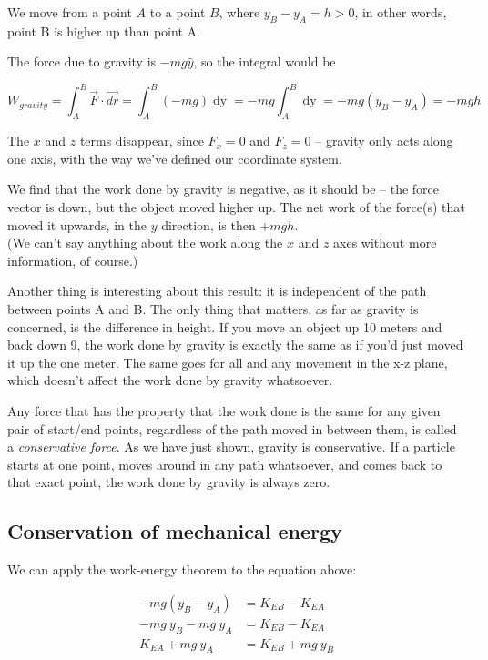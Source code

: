 We move from a point $A$ to a point $B$, where $y_B - y_A = h > 0$, in other words, point B is higher up than point A.

The force due to gravity is $- m g \hat{y}$, so the integral would be

\begin{equation}
W_{gravity} = \int_A^B \vec{F} \cdot \vec{dr} = \int_A^B (- m g) \mathop{dy} = - m g \int_A^B \mathop{dy} = -m g(y_B - y_A) = -m g h
\end{equation}

The $x$ and $z$ terms disappear, since $F_x = 0$ and $F_z = 0$ -- gravity only acts along one axis, with the way we've defined our coordinate system.

We find that the work done by gravity is negative, as it should be -- the force vector is down, but the object moved higher up. The net work of the force(s) that moved it upwards, in the $y$ direction, is then $+ m g h$.\\
(We can't say anything about the work along the $x$ and $z$ axes without more information, of course.)

Another thing is interesting about this result: it is independent of the path between points A and B. The only thing that matters, as far as gravity is concerned, is the difference in height. If you move an object up 10 meters and back down 9, the work done by gravity is exactly the same as if you'd just moved it up the one meter. The same goes for all and any movement in the x-z plane, which doesn't affect the work done by gravity whatsoever.

Any force that has the property that the work done is the same for any given pair of start/end points, regardless of the path moved in between them, is called a \emph{conservative force}. As we have just shown, gravity is conservative. If a particle starts at one point, moves around in any path whatsoever, and comes back to that exact point, the work done by gravity is always zero.

\subsection{Conservation of mechanical energy}

We can apply the work-energy theorem to the equation above:

\begin{align}
-m g(y_B - y_A)& = K_{EB} - K_{EA}\\
-m g\ y_B - m g\ y_A &= K_{EB} - K_{EA}\\
K_{EA} + m g\ y_A &= K_{EB} + m g\ y_B
\end{align}

